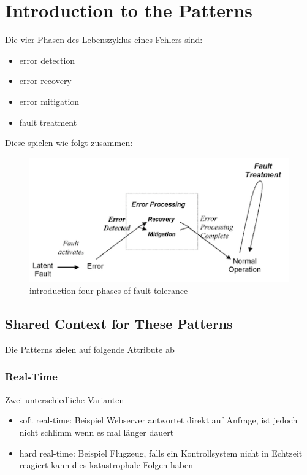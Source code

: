 \section{Introduction to the Patterns}

Die vier Phasen des Lebenszyklus eines Fehlers sind:
\begin{itemize}
	\item error detection
	\item error recovery
	\item error mitigation
	\item fault treatment
\end{itemize}

Diese spielen wie folgt zusammen:

\begin{figure}[H]
	\centering
	\includegraphics[width=\textwidth]{content/faulttolerance/images/introduction_four_phases_of_fault_tolerance.png}
	\caption{introduction four phases of fault tolerance}
\end{figure}


\subsection{Shared Context for These Patterns}

Die Patterns zielen auf folgende Attribute ab

\subsubsection*{Real-Time}

Zwei unterschiedliche Varianten
\begin{itemize}
	\item soft real-time: Beispiel Webserver antwortet direkt auf Anfrage, ist jedoch nicht schlimm wenn es mal länger dauert
	\item hard real-time: Beispiel Flugzeug, falls ein Kontrollsystem nicht in Echtzeit reagiert kann dies katastrophale Folgen haben
\end{itemize}

